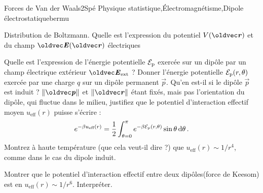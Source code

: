 \begin{exercise}{Forces de Van der Waals}{2}{Spé}
{Physique statistique,\'Electromagnétisme,Dipole électrostatique}{bermu}

\begin{questions}
    \questioncours Distribution de Boltzmann.
    \question Quelle est l'expression du potentiel $V(\vr)$ et du champ $\vE(\vr)$ électriques
    \question Quelle est l'expression de l'énergie potentielle $\mathcal{E}_\text{p}$ exercée sur un dipôle par un champ électrique extérieur $\vE_\text{ext}$ ?
    \question Donner l'énergie potentielle $\mathcal{E}_\text{p}(r,\theta)$ exercée par une charge $q$ sur un dipôle permanent $\vec{p}$.
    \question Qu'en est-il si le dipôle $\vec{p}$ est induit ?
    \question $\norm{\vec{p}}$ et $\norm{\vec{r}}$ étant fixés, mais pas l'orientation du dipôle, qui fluctue dans le milieu, justifiez que le potentiel d'interaction effectif moyen $u_\text{eff}(r)$ puisse s'écrire :
    $$e^{-\beta u_\text{eff}(r)} = \dfrac{1}{2}\int_{\theta=0}^\pi e^{-\beta \mathcal{E}_\text{p}(r,\theta)} \sin\theta\dd{\theta}.$$
    \question Montrez à haute température (que cela veut-il dire ?) que $u_\text{eff}(r) \sim 1/r^4$, comme dans le cas du dipole induit.

    \plusloin

    \question Montrer que le potentiel d'interaction effectif entre deux dipôles(force de Keesom) est en $u_\text{eff}(r) \sim 1/r^6$. Interpréter.
\end{questions}


\end{exercise}


